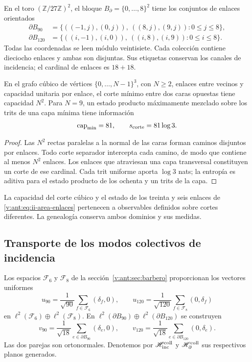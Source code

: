 En el toro \((\mathbb Z/27\mathbb Z)^2\), el bloque
\(B_\partial=\{0,\ldots,8\}^2\) tiene los conjuntos de enlaces
orientados
\begin{align}
 \partial B_{90}
 &=\{((-1,j),(0,j)),\ ((8,j),(9,j)):0\le j\le8\},\\
 \partial B_{120}
 &=\{((i,-1),(i,0)),\ ((i,8),(i,9)):0\le i\le8\}.
 \label{v:ant:eq:ii-area-enlaces}
\end{align}
Todas las coordenadas se leen módulo veintisiete. Cada colección contiene
dieciocho enlaces y ambas son disjuntas. Sus etiquetas conservan los
canales de incidencia; el cardinal de enlaces es \(18+18\).

\begin{theorem}
\label{v:ant:thm:ii-area-corte-minimo}
En el grafo cúbico de vértices \(\{0,\ldots,N-1\}^3\), con
\(N\ge2\), enlaces entre vecinos y capacidad unitaria por enlace,
el corte mínimo entre dos caras opuestas tiene capacidad \(N^2\).
Para \(N=9\), un estado producto máximamente mezclado sobre los
trits de una capa mínima tiene información
\begin{equation}
 \operatorname{cap}_{\min}=81,\qquad s_{\rm corte}=81\log3.
 \label{v:ant:eq:ii-area-corte-informacion}
\end{equation}
\end{theorem}
\begin{proof}
Las \(N^2\) rectas paralelas a la normal de las caras forman caminos
disjuntos por enlaces. Todo corte separador intercepta cada camino, de
modo que contiene al menos \(N^2\) enlaces. Los enlaces que atraviesan
una capa transversal constituyen un corte de ese cardinal. Cada trit
uniforme aporta \(\log3\) nats; la entropía es aditiva para el estado
producto de los ochenta y un trits de la capa.
\end{proof}

La capacidad del corte cúbico y el estado de los treinta y seis enlaces
de \eqref{v:ant:eq:ii-area-enlaces} pertenecen a observables definidos sobre
cortes diferentes. La genealogía conserva ambos dominios y sus medidas.

\subsection{Transporte de los modos colectivos de incidencia}
\label{v:ant:sec:ii-area-transporte-colectivo}

Los espacios \(\mathcal F_6\) y \(\mathcal F_8\) de la
sección~\ref{v:ant:sec:barbero} proporcionan los vectores uniformes
\[
 u_{90}=\frac1{\sqrt{90}}\sum_{f\in\mathcal F_6}(\delta_f,0),
 \qquad
 u_{120}=\frac1{\sqrt{120}}\sum_{f\in\mathcal F_8}(0,\delta_f)
\]
en \(\ell^2(\mathcal F_6)\oplus\ell^2(\mathcal F_8)\).
En \(\ell^2(\partial B_{90})\oplus\ell^2(\partial B_{120})\)
se construyen
\[
 v_{90}=\frac1{\sqrt{18}}\sum_{e\in\partial B_{90}}(\delta_e,0),
 \qquad
 v_{120}=\frac1{\sqrt{18}}\sum_{e\in\partial B_{120}}(0,\delta_e).
\]
Las dos parejas son ortonormales. Denotemos por
\(\mathscr H_{\rm inc}^{\rm coll}\) y
\(\mathscr H_\partial^{\rm coll}\) sus respectivos planos generados.

